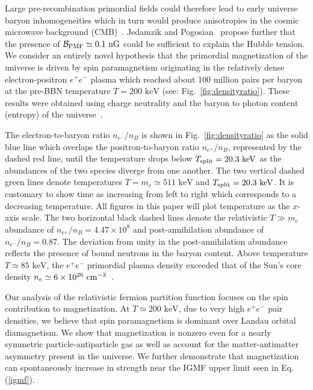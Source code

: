 \documentclass[reprint]{revtex4-2}
\newcommand*{\keV}{\text{ keV}}
\newcommand{\req}[1]{Eq.\,(\ref{#1})}
\newcommand{\rf}[1]{Fig.~{\ref{#1}}}
\newcommand*{\xblue}{\color{black}}
\begin{document}
Large pre-recombination primordial fields could therefore lead to early universe baryon inhomogeneities which in turn would produce anisotropies in the cosmic microwave background (CMB)~\cite{jedamzik2013smallscale,abdalla2022cosmology}. Jedamzik and Pogosian~\cite{jedamzik2020relieving} propose further that the presence of ${\cal B}_{\rm PMF}\simeq0.1{\rm\ nG}$ could be sufficient to explain the Hubble tension. We consider an entirely novel hypothesis that the primordial magnetization of the universe is driven by spin paramagnetism originating in the relatively dense electron-positron $e^{+}e^{-}$ plasma which reached about 100 million pairs per baryon at the pre-BBN temperature $T=200\keV$ (see: \rf{fig:densityratio}). These results were obtained using charge neutrality and the baryon to photon content (entropy) of the universe~\cite{rafelski2023short}.

{\xblue The electron-to-baryon ratio $n_{e^{-}}/n_{B}$ is shown in \rf{fig:densityratio} as the solid blue line which overlaps the positron-to-baryon ratio $n_{e^{+}}/n_{B}$, represented by the dashed red line, until the temperature drops below $T_{\rm split}=20.3\keV$ as the abundances of the two species diverge from one another.} The two vertical dashed green lines denote temperatures $T=m_{e}\simeq511\keV$ and $T_{\rm split}=20.3\keV$. {\xblue It is customary to show time as increasing from left to right which corresponds to a decreasing temperature. All figures in this paper will plot temperature as the $x$-axis scale.} The two horizontal black dashed lines denote the relativistic $T\gg m_e$ abundance of $n_{e^{\pm}}/n_{B}=4.47\times10^{8}$ and post-annihilation {\xblue abundance of  $n_{e^{-}}/n_{B}=0.87$. The deviation from unity in the post-annihilation abundance reflects the presence of bound neutrons in the baryon content.} Above temperature $T\simeq85\keV$, the $e^{+}e^{-}$ primordial plasma density exceeded that of the Sun's core density $n_{e}\simeq6\times10^{26}{\rm\ cm}^{-3}$~\cite{bahcall2001solar}. 

{\xblue Our analysis of the relativistic fermion partition function focuses} on the spin contribution to magnetization. {\xblue At $T\simeq200\keV$, due to very high $e^{+}e^{-}$ pair densities, we believe that spin paramagnetism is dominant over Landau orbital diamagnetism.} We show that magnetization is nonzero {\xblue even for a nearly symmetric particle-antiparticle gas as well as account for the matter-antimatter asymmetry present in the universe.} We further demonstrate that magnetization can spontaneously increase in strength near the IGMF upper limit seen in \req{igmf}.
\end{document}
